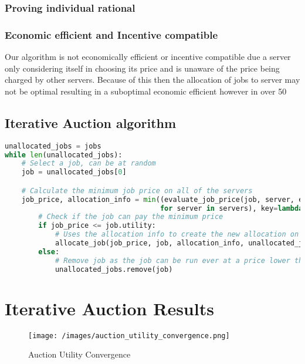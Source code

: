 \subsubsection{Proving individual rational}
\subsubsection{Economic efficient and Incentive compatible}
Our algorithm is not economically efficient or incentive compatible due a server only considering itself in choosing its
price and is unaware of the price being charged by other servers. Because of this then the allocation of jobs to server
may not be optimal resulting in a suboptimal economic efficient however in over 50%

\subsection{Iterative Auction algorithm}\label{subsec:iterative-auction-algorithm}
\begin{lstlisting}[language=Python]
unallocated_jobs = jobs
while len(unallocated_jobs):
    # Select a job, can be at random
    job = unallocated_jobs[0]

    # Calculate the minimum job price on all of the servers
    job_price, allocation_info = min((evaluate_job_price(job, server, epsilon=epsilon)
                                     for server in servers), key=lambda bid: bid[0])
        # Check if the job can pay the minimum price
        if job_price <= job.utility:
            # Uses the allocation info to create the new allocation on the selected server
            allocate_job(job_price, job, allocation_info, unallocated_jobs)
        else:
            # Remove job as the job can be run ever at a price lower than the job's true utility
            unallocated_jobs.remove(job)
\end{lstlisting}

\section{Iterative Auction Results}\label{sec:auctions-results}
\begin{figure}[H]
    \centering
    \texttt{[image: /images/auction\_utility\_convergence.png]}
    \caption{Auction Utility Convergence}
\end{figure}

